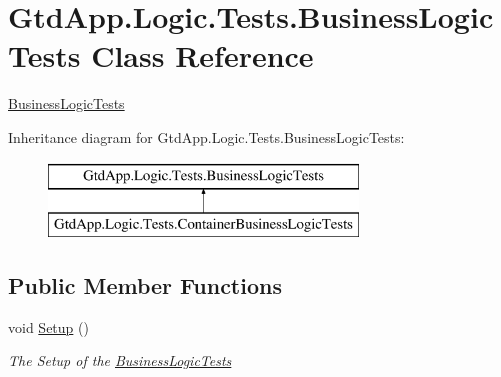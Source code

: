 \hypertarget{class_gtd_app_1_1_logic_1_1_tests_1_1_business_logic_tests}{}\section{Gtd\+App.\+Logic.\+Tests.\+Business\+Logic\+Tests Class Reference}
\label{class_gtd_app_1_1_logic_1_1_tests_1_1_business_logic_tests}


\mbox{\hyperlink{class_gtd_app_1_1_logic_1_1_tests_1_1_business_logic_tests}{Business\+Logic\+Tests}}  


Inheritance diagram for Gtd\+App.\+Logic.\+Tests.\+Business\+Logic\+Tests\+:\begin{figure}[H]
\begin{center}
\leavevmode
\includegraphics[height=2.000000cm]{class_gtd_app_1_1_logic_1_1_tests_1_1_business_logic_tests}
\end{center}
\end{figure}
\subsection*{Public Member Functions}
\begin{DoxyCompactItemize}
\item 
void \mbox{\hyperlink{class_gtd_app_1_1_logic_1_1_tests_1_1_business_logic_tests_af034ee44aecbba758b26f64640206211}{Setup}} ()
\begin{DoxyCompactList}\small\item\em The Setup of the \mbox{\hyperlink{class_gtd_app_1_1_logic_1_1_tests_1_1_business_logic_tests}{Business\+Logic\+Tests}} \end{DoxyCompactList}\end{DoxyCompactItemize}
